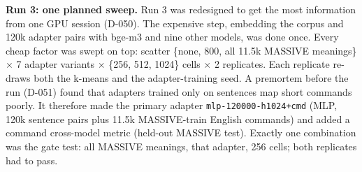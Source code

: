 \documentclass[
  10pt,
]{article}
\begin{document}
\textbf{Run 3: one planned sweep.} Run 3 was redesigned to get the most
information from one GPU session (D-050). The expensive step, embedding
the corpus and 120k adapter pairs with bge-m3 and nine other models, was
done once. Every cheap factor was swept on top: scatter \{none, 800, all
11.5k MASSIVE meanings\} $\times$ 7 adapter variants $\times$ \{256, 512, 1024\} cells
$\times$ 2 replicates. Each replicate re-draws both the k-means and the
adapter-training seed. A premortem before the run (D-051) found that
adapters trained only on sentences map short commands poorly. It
therefore made the primary adapter \texttt{mlp-120000-h1024+cmd} (MLP,
120k sentence pairs plus 11.5k MASSIVE-train English commands) and added
a command cross-model metric (held-out MASSIVE test). Exactly one
combination was the gate test: all MASSIVE meanings, that adapter, 256
cells; both replicates had to pass.
\end{document}

